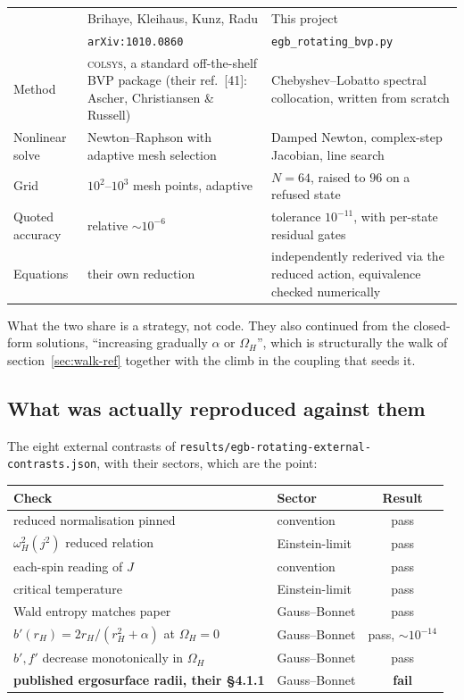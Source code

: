 \documentclass[11pt,a4paper]{article}
\newcommand{\q}[1]{\subsection*{\color{accent}#1}}
\begin{document}
\begin{center}\small
\begin{tabular}{@{}>{\raggedright\arraybackslash}p{.17\linewidth}>{\raggedright\arraybackslash}p{.37\linewidth}>{\raggedright\arraybackslash}p{.37\linewidth}@{}}
\toprule
 & Brihaye, Kleihaus, Kunz, Radu & This project \\
 & \texttt{arXiv:1010.0860} & \texttt{egb\_rotating\_bvp.py} \\
\midrule
Method & \textsc{colsys}, a standard off-the-shelf BVP package (their ref.~[41]: Ascher, Christiansen \& Russell) & Chebyshev--Lobatto spectral collocation, written from scratch \\[3pt]
Nonlinear solve & Newton--Raphson with adaptive mesh selection & Damped Newton, complex-step Jacobian, line search \\[3pt]
Grid & $10^2$--$10^3$ mesh points, adaptive & $N=64$, raised to $96$ on a refused state \\[3pt]
Quoted accuracy & relative $\sim10^{-6}$ & tolerance $10^{-11}$, with per-state residual gates \\[3pt]
Equations & their own reduction & independently rederived via the reduced action, equivalence checked numerically \\
\bottomrule
\end{tabular}
\end{center}

\noindent What the two share is a strategy, not code. They also continued from
the closed-form solutions, ``increasing gradually $\alpha$ or $\Omega_H$'',
which is structurally the walk of section~\ref{sec:walk-ref} together with the
climb in the coupling that seeds it.

\q{What was actually reproduced against them}

The eight external contrasts of
\texttt{results/egb-rotating-external-contrasts.json}, with their sectors,
which are the point:

\begin{center}\small
\begin{tabular}{@{}llc@{}}
\toprule
Check & Sector & Result \\
\midrule
reduced normalisation pinned & convention & pass \\
$\omega_H^2(j^2)$ reduced relation & Einstein-limit & pass \\
each-spin reading of $J$ & convention & pass \\
critical temperature & Einstein-limit & pass \\
Wald entropy matches paper & Gauss--Bonnet & pass \\
$b'(r_H)=2r_H/(r_H^2+\alpha)$ at $\Omega_H=0$ & Gauss--Bonnet & pass, $\sim10^{-14}$ \\
$b',f'$ decrease monotonically in $\Omega_H$ & Gauss--Bonnet & pass \\
\textbf{published ergosurface radii, their \S4.1.1} & Gauss--Bonnet & \textbf{fail} \\
\bottomrule
\end{tabular}
\end{center}
\end{document}
